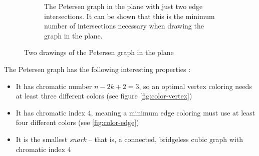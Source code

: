 \documentclass[11pt,            %
               a4paper,         %
               oneside,         %
               DIV12,           %
               fleqn,           %
               halfparskip,     %
               nochapterprefix, %
              ]{scrartcl} %
\theoremstyle{definition}
\begin{document}
\begin{figure}[p]
\begin{subfigure}[t]{.45\textwidth}
    \caption{The Petersen graph in the plane with just two edge
      intersections. It can be shown that this is the minimum number of
      intersections necessary when drawing the graph in the plane.}
    \label{fig:petersen-twointersect}
  \end{subfigure}
  \caption{Two drawings of the Petersen graph in the plane}
\end{figure}

The Petersen graph has the following interesting properties \cite{petersengraphbook,petersen}:

\begin{itemize}
  \item It has chromatic number $n - 2k + 2 = 3$, so an optimal vertex
    coloring needs at least three different colors (see figure
    \ref{fig:color-vertex})
  \item It has chromatic index 4, meaning a minimum edge coloring must
    use at least four different colors (see \ref{fig:color-edge})
  \item It is the smallest
    \emph{snark}\footnotemark{} -- that is, a connected, bridgeless cubic graph with
    chromatic index 4
\end{itemize}
\end{document}
